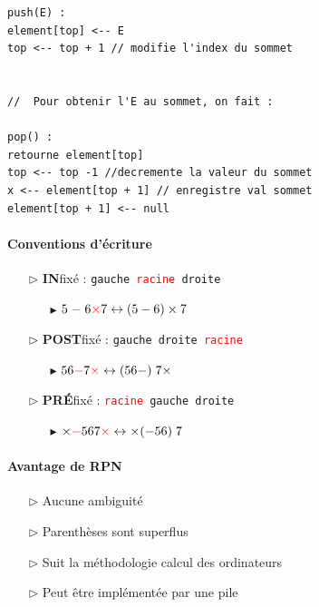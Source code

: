 \documentclass{report}
\begin{document}
\begin{multicols*}{3}
\begin{lstlisting}
push(E) :
element[top] <-- E
top <-- top + 1 // modifie l'index du sommet 


//  Pour obtenir l'E au sommet, on fait : 

pop() :
retourne element[top] 
top <-- top -1 //decremente la valeur du sommet
x <-- element[top + 1] // enregistre val sommet  
element[top + 1] <-- null
    \end{lstlisting}


    \paragraph{Conventions d'écriture}

    \begin{itemize}
      \item [$\rhd$ ] \textbf{IN}fixé : \texttt{gauche \textcolor{red}{racine} droite}   
        \begin{itemize}
          \item [$\blacktriangleright$ ] 
            $5 \; \textcolor{red}{ - } \;   6 \textcolor{red}{\times} 7
            \leftrightarrow (5 - 6) \times 7 $  
        \end{itemize}
      \item [$\rhd$ ] \textbf{POST}fixé : 
        \texttt{gauche droite \textcolor{red}{racine}}   
        \begin{itemize}
          \item [$\blacktriangleright$ ] 
            $56 \textcolor{red}{ - }   7 \textcolor{red}{\times} 
            \leftrightarrow (56-) \; 7\times$  
        \end{itemize}
      \item [$\rhd$ ] \textbf{PRÉ}fixé : \texttt{\textcolor{red}{racine} gauche droite}  
        \begin{itemize}
          \item [$\blacktriangleright$ ] 
            $\times \textcolor{red}{ - }567 \textcolor{red}{\times} 
            \leftrightarrow \times (-56) \; 7$  
        \end{itemize}
    \end{itemize}


    \paragraph{Avantage de RPN}
    \begin{itemize}
      \item [$\rhd$ ] Aucune ambiguité
      \item [$\rhd$ ] Parenthèses sont superflus 
      \item [$\rhd$ ] Suit la méthodologie calcul des ordinateurs
      \item [$\rhd$ ] Peut être implémentée par une pile
    \end{itemize}



\end{multicols*}
\end{document}
